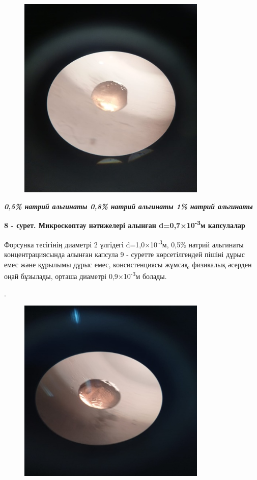 \begin{figure}[H]
	\centering
	\includegraphics[width=0.8\textwidth]{media/pish/image37}
	\caption*{}
\end{figure}


\emph{{\bfseries 0,5\% натрий альгинаты 0,8\% натрий альгинаты 1\% натрий альгинаты}}

{\bfseries 8 - сурет. Микроскоптау нәтижелері алынған d=0,7×10\textsuperscript{-3}м капсулалар}

Форсунка тесігінің диаметрі 2 үлгідегі d=1,0×10\textsuperscript{-3}м,
0,5\% натрий альгинаты концентрациясында алынған капсула 9 - суретте
көрсетілгендей пішіні дұрыс емес және құрылымы дұрыс емес,
консистенциясы жұмсақ, физикалық әсерден оңай бұзылады, орташа диаметрі
0,9×10\textsuperscript{-3}м болады.

. 
\begin{figure}[H]
	\centering
	\includegraphics[width=0.8\textwidth]{media/pish/image38}
	\caption*{}
\end{figure}


